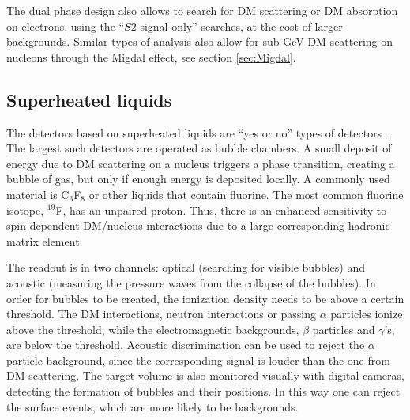 The dual phase design also allows to search for DM scattering or DM absorption on electrons, using the ``$S2$ signal only'' searches, at the cost of larger backgrounds. Similar types of analysis also allow for sub-GeV DM scattering on nucleons through the Migdal effect, see section \ref{sec:Migdal}.


\subsection{Superheated liquids}

The detectors based on superheated liquids are ``yes or no'' types of detectors~\cite{Pullia:2014vra}. The largest such detectors are operated as bubble chambers. A small deposit of energy due to DM scattering on a nucleus triggers a phase transition, creating a bubble of gas, but only if enough energy is deposited locally.
 A commonly used material is C${}_3$F${}_8$ or other liquids that contain fluorine. The most common fluorine isotope, ${}^{19}$F, has an unpaired proton. Thus, there is an enhanced sensitivity to spin-dependent DM/nucleus interactions due to a large corresponding hadronic matrix element.

\smallskip

The readout is in two channels: optical (searching for visible bubbles) and acoustic (measuring the pressure waves from the collapse of the bubbles).  In order for bubbles to be created, the ionization density needs to be above a certain threshold. The DM interactions, neutron interactions or passing $\alpha$ particles ionize above the threshold, while the electromagnetic backgrounds, $\beta$ particles and $\gamma$'s, are below the threshold. Acoustic discrimination can be used to reject the $\alpha$ particle background, since the corresponding signal is louder than the one from DM scattering. The target volume is also monitored visually with digital cameras, detecting the formation of bubbles and their positions. In this way one can reject the surface events, which are more likely to be backgrounds.

